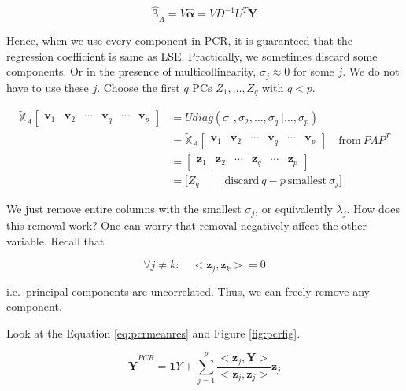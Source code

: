 \documentclass[]{book}
\theoremstyle{definition}
\theoremstyle{definition}
\theoremstyle{definition}
\theoremstyle{remark}
\begin{document}
\begin{equation}
  \boldsymbol{\hat\beta}_{A} = V \hat{\boldsymbol\alpha} = VD^{-1}U^T \mathbf{Y}
  \label{eq:pcrlse}
\end{equation}

Hence, when we use every component in PCR, it is guaranteed that the regression coefficient is same as LSE. Practically, we sometimes discard some components. Or in the presence of multicollinearity, \(\sigma_j \approx 0\) for some \(j\). We do not have to use these \(j\). Choose the first \(q\) PCs \(Z_1, \ldots, Z_q\) with \(q < p\).

\begin{equation}
  \begin{split}
    \widetilde{\mathbb{X}}_A \left[\begin{array}{cccc|cc}
      \mathbf{v}_1 & \mathbf{v}_2 & \cdots & \mathbf{v}_q & \cdots & \mathbf{v}_p
    \end{array}\right] & = U diag(\sigma_1, \sigma_2, \ldots, \sigma_q \: \bigg\vert \ldots, \sigma_p ) \\
    & = \widetilde{\mathbb{X}}_A \left[\begin{array}{cccc|cc}
      \mathbf{v}_1 & \mathbf{v}_2 & \cdots & \mathbf{v}_q & \cdots & \mathbf{v}_p
    \end{array}\right] \quad \text{from}\: P\Lambda P^T \\
    & = \left[\begin{array}{cccc|cc}
      \mathbf{z}_1 & \mathbf{z}_2 & \cdots & \mathbf{z}_q & \cdots & \mathbf{z}_p
    \end{array}\right] \\
    & = \Big[ Z_q \quad \Big\vert \quad \text{discard}\: q - p \: \text{smallest}\: \sigma_j \Big]
  \end{split}
  \label{eq:pcrdimred}
\end{equation}

We just remove entire columns with the smallest \(\sigma_j\), or equivalently \(\lambda_j\). How does this removal work? One can worry that removal negatively affect the other variable. Recall that

\[\forall j \neq k : \quad <\mathbf{z}_j, \mathbf{z}_k> = 0\]

i.e.~principal components are uncorrelated. Thus, we can freely remove any component.

Look at the Equation \eqref{eq:pcrmeanres} and Figure \ref{fig:pcrfig}.

\begin{equation}
  \hat{\mathbf{Y}}^{PCR} = \mathbf{1} \overline{Y} + \sum_{j = 1}^p \frac{< \mathbf{z}_j, \mathbf{Y} >}{< \mathbf{z}_j, \mathbf{z}_j >} \mathbf{z}_j
  \label{eq:pcrsimple}
\end{equation}
\end{document}
